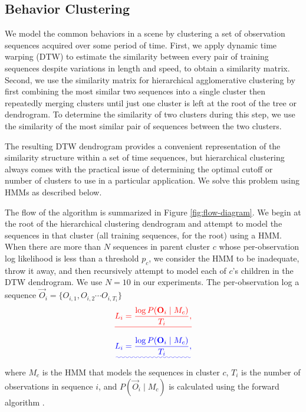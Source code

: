 \subsection{Behavior Clustering}
\label{sec:clustering-behavior-clustering}

We model the common behaviors in a scene by clustering a set of
observation sequences acquired over some period of time. First, we
apply dynamic time warping (DTW) to estimate the similarity between
every pair of training sequences despite variations in length and
speed, to obtain a similarity matrix. Second, we use the similarity
matrix for hierarchical agglomerative clustering by first combining
the most similar two sequences into a single cluster then repeatedly
merging clusters until just one cluster is left at the root of the
tree or dendrogram.  To determine the similarity of two clusters
during this step, we use the similarity of the most similar pair of
sequences between the two clusters.

The resulting DTW dendrogram provides a convenient representation of
the similarity structure within a set of time sequences, but
hierarchical clustering always comes with the practical issue of
determining the optimal cutoff or number of clusters to use in a
particular application.  We solve this problem using HMMs as described
below.

The flow of the algorithm is summarized in
Figure \ref{fig:flow-diagram}.  We begin at the root of the
hierarchical clustering dendrogram and attempt to model the sequences
in that cluster (all training sequences, for the root) using a
HMM. When there are more than $N$ sequences in parent cluster $c$
whose per-observation log likelihood is less than a threshold $p_c$,
we consider the HMM to be inadequate, throw it away, and then
recursively attempt to model each of $c$'s children in the DTW
dendrogram.  We use $N=10$ in our experiments. The per-observation log
\DIFdelbegin {}\DIFdelend \DIFaddbegin {}\DIFaddend a sequence $\vec{O}_i = \{ O_{i, 1}, O_{i, 2} \cdots
O_{i, T_i} \}$ \DIFdelbegin {}\[\DIFdel{
  L_{i} = \frac{\log P( \vec{O}_i \mid M_c )}{T_i},
}\]
\DIFdelend \DIFaddbegin {}\begin{equation}\DIFadd{
    L_{i} = \frac{\log P( \vec{O}_i \mid M_c )}{T_i},
}\end{equation}
\DIFaddend where $M_c$ is the HMM that models the sequences in cluster $c$, $T_i$
is the number of observations in sequence $i$, and $P(\vec{O}_i
\mid M_c)$ is calculated using the forward algorithm .

